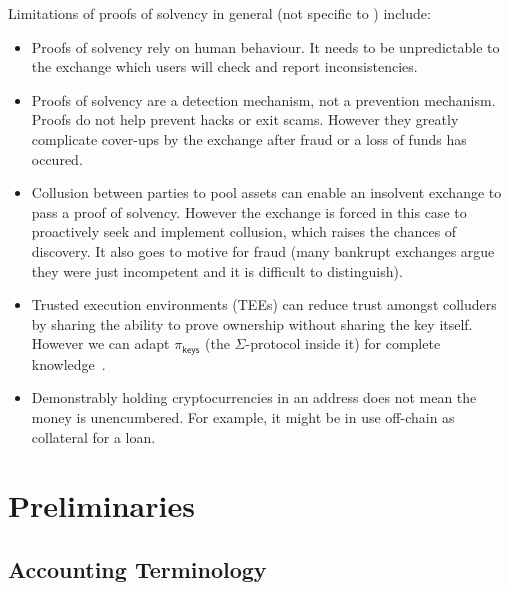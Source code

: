 Limitations of proofs of solvency in general (not specific to \Sys) include:

\begin{itemize}
\item Proofs of solvency rely on human behaviour. It needs to be unpredictable to the exchange which users will check and report inconsistencies.
\item Proofs of solvency are a detection mechanism, not a prevention mechanism. Proofs do not help prevent hacks or exit scams. However they greatly complicate cover-ups by the exchange after fraud or a loss of funds has occured.
\item Collusion between parties to pool assets can enable an insolvent exchange to pass a proof of solvency. However the exchange is forced in this case to proactively seek and implement collusion, which raises the chances of discovery. It also goes to motive for fraud (many bankrupt exchanges argue they were just incompetent and it is difficult to distinguish). 
\item Trusted execution environments (TEEs) can reduce trust amongst colluders by sharing the ability to prove ownership without sharing the key itself. However we can adapt $\pi_\mathsf{keys}$ (the $\Sigma$-protocol inside it) for complete knowledge~\cite{completeknowledge}.
\item Demonstrably holding cryptocurrencies in an address does not mean the money is unencumbered. For example, it might be in use off-chain as collateral for a loan. 
\end{itemize}


\section{Preliminaries}

\subsection{Accounting Terminology}

